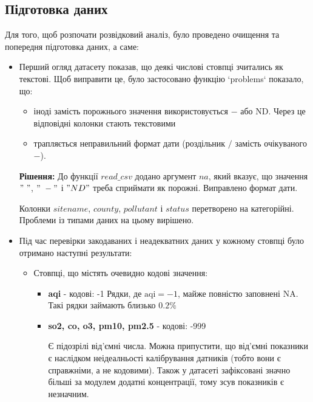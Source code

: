 \documentclass[./report.tex]{subfiles}
\begin{document}
\subsection{Підготовка даних}

Для того, щоб розпочати розвідковий аналіз, було проведено очищення та попередня підготовка даних, а саме:

\begin{itemize}
    \item Перший огляд датасету показав, що деякі числові стовпці зчитались як текстові.
    Щоб виправити це, було застосовано функцію `problems` показало, що:

      \begin{itemize}
        \item іноді замість порожнього значення використовується $-$ або ND.
        Через це відповідні колонки стають текстовими
        \item трапляється неправильний формат дати (роздільник $/$ замість очікуваного $-$).
      \end{itemize}

   \textbf{Рішення:} До функції $read\_csv$ додано аргумент $na$, який вказує, що значення
   $" \ "$, $"\ -"$ і $"ND"$ треба сприймати як порожні. Виправлено формат дати.

   Колонки $sitename$, $county$, $pollutant$ і $status$ перетворено на категорійні.
   Проблеми із типами даних на цьому вирішено.

   \newpage

    \item Під час перевірки закодаваних і неадекватних даних у кожному стовпці було отримано наступні результати:
      \begin{itemize}
        \item Стовпці, що містять очевидно кодові значення:
        \begin{itemize}
          \item \textbf{aqi} - кодові: -1
          Рядки, де $\text{aqi} = -1$, майже повністю заповнені NA. Такі рядки займають близько $0.2\%$
          \item \textbf{so2, co, o3, pm10, pm2.5} - кодові: -999

          Є підозрілі від'ємні числа. Можна припустити, що від'ємні показники є наслідком
          неідеалньості калібрування датників (тобто вони є справжніми, а не кодовими).
          Також у датасеті зафіксовані значно більші за модулем додатні концентрації,
          тому зсув показників є незначним.


\end{itemize}
\end{itemize}
\end{itemize}
\end{document}
